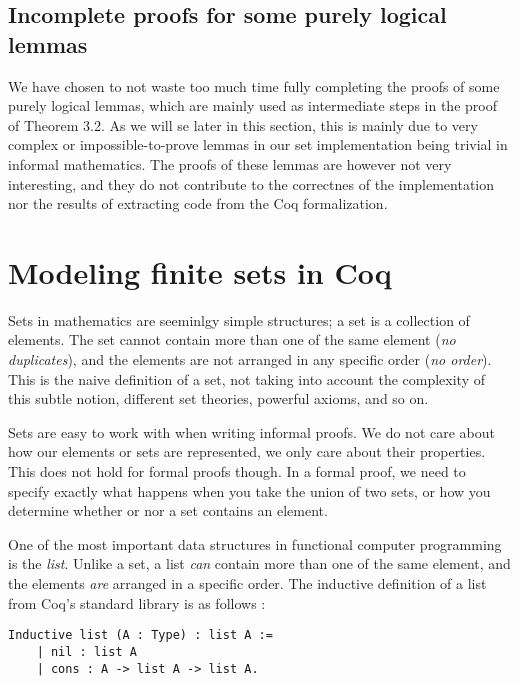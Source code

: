 \subsection{Incomplete proofs for some purely logical lemmas}
\label{ssec:incomplete_proofs_for_some_purely_logical_lemmas}

We have chosen to not waste too much time fully completing the proofs of some purely logical lemmas,
which are mainly used as intermediate steps in the proof of Theorem 3.2.
As we will se later in this section, this is mainly due to
very complex or impossible-to-prove lemmas in our set implementation
being trivial in informal mathematics.
The proofs of these lemmas are however not very interesting,
and they do not contribute to the correctnes of the implementation nor
the results of extracting code from the Coq formalization.

\section{Modeling finite sets in Coq}
\label{sec:modeling_finite_sets_in_coq}

Sets in mathematics are seeminlgy simple structures; a set is a collection of elements.
The set cannot contain more than one of the same element (\textit{no duplicates}), and the elements are not arranged in any
specific order (\textit{no order}).
This is the naive definition of a set, not taking into account the complexity of this subtle notion,
different set theories, powerful axioms, and so on.

Sets are easy to work with when writing informal proofs.
We do not care about how our elements or sets are represented, we only care about their properties.
This does not hold for formal proofs though. In a formal proof, we need to specify exactly what happens
when you take the union of two sets, or how you determine whether or nor a set contains an element.

One of the most important data structures in functional computer programming is the \textit{list}.
Unlike a set, a list \textit{can} contain more than one of the same element, and the elements \textit{are} arranged in a
specific order.
The inductive definition of a list from Coq's standard library is as follows \cite{coqdatatypes}:

\begin{minipage}{\linewidth}
\begin{lstlisting}[language=Coq, label={lst:list_def}, caption={Inductive definition of list type in Coq}]
Inductive list (A : Type) : list A :=
    | nil : list A
    | cons : A -> list A -> list A.
\end{lstlisting}
\end{minipage}

